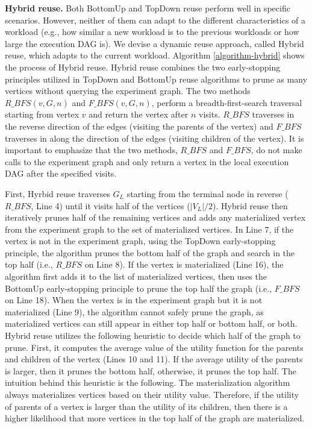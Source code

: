 \textbf{Hybrid reuse.}
Both BottomUp and TopDown reuse perform well in specific scenarios. 
However, neither of them can adapt to the different characteristics of a workload (e.g., how similar a new workload is to the previous workloads or how large the execution DAG is).
We devise a dynamic reuse approach, called Hybrid reuse, which adapts to the current workload.
Algorithm \ref{algorithm-hybrid} shows the process of Hybrid reuse.
Hybrid reuse combines the two early-stopping principles utilized in TopDown and BottomUp reuse algorithms to prune as many vertices without querying the experiment graph.
The two methods $R\_BFS(v, G, n)$ and $F\_BFS(v, G, n)$, perform a breadth-first-search traversal starting from vertex $v$ and return the vertex after $n$ visits.
$R\_BFS$ traverses in the reverse direction of the edges (visiting the parents of the vertex) and $F\_BFS$ traverses in along the direction of the edges (visiting children of the vertex).
It is important to emphasize that the two methods,  $R\_BFS$ and $F\_BFS$, do not make calls to the experiment graph and only return a vertex in the local execution DAG after the specified visits.

First, Hyrbid reuse traverses $G_L$ starting from the terminal node in reverse ($R\_BFS$, Line 4) until it visits half of the vertices ($|V_L|/2$).
Hybrid reuse then iteratively prunes half of the remaining vertices and adds any materialized vertex from the experiment graph to the set of materialized vertices.
In Line 7, if the vertex is not in the experiment graph, using the TopDown early-stopping principle, the algorithm prunes the bottom half of the graph and search in the top half (i.e., $R\_BFS$ on Line 8).
If the vertex is materialized (Line 16), the algorithm first adds it to the list of materialized vertices, then uses the BottomUp early-stopping principle to prune the top half the graph (i.e., $F\_BFS$ on Line 18).
When the vertex is in the experiment graph but it is not materialized (Line 9), the algorithm cannot safely prune the graph, as materialized vertices can still appear in either top half or bottom half, or both.
Hybrid reuse utilizes the following heuristic to decide which half of the graph to prune.
First, it computes the average value of the utility function for the parents and children of the vertex (Lines 10 and 11).
If the average utility of the parents is larger, then it prunes the bottom half, otherwise, it prunes the top half.
The intuition behind this heuristic is the following.
The materialization algorithm always materializes vertices based on their utility value.
Therefore, if the utility of parents of a vertex is larger than the utility of its children, then there is a higher likelihood that more vertices in the top half of the graph are materialized.

